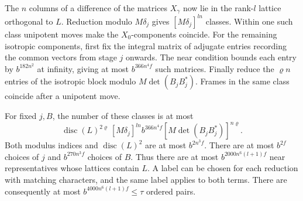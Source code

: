 The \(n\) columns of a difference of the matrices \(X_\gamma\) now lie
in the rank-\(l\) lattice orthogonal to \(L\). Reduction modulo
\(M\delta_j\) gives \([M\delta_j]^{ln}\) classes. Within one such class
unipotent moves make the \(X_0\)-components coincide. For the remaining
isotropic components, first fix the integral matrix of adjugate
entries recording the common vectors from stage \(j\) onwards. The
near condition bounds each entry by \(b^{182n^2}\) at infinity, giving
at most \(b^{366n^4 f}\) such matrices. Finally reduce the \(\varrho n\)
entries of the isotropic block modulo \(M\det(B_j B_j^*)\).
Frames in the same class coincide after a unipotent move.

For fixed \(j,B\), the number of these classes is at most
\[
 \operatorname{disc}(L)^{2\varrho}\,[M\delta_j]^{ln}
       b^{366n^4 f}[M\det(B_j B_j^*)]^{n\varrho}.
\]
Both modulus indices and \(\operatorname{disc}(L)^2\) are at most
\(b^{2n^3f}\). There are at most \(b^{2f}\) choices of \(j\) and
\(b^{270n^3f}\) choices of \(B\). Thus there are at most
\(b^{2000n^6(l+1)f}\) near representatives whose lattices contain \(L\).
A label can be chosen for each reduction with matching characters,
and the same label applies to both terms. There are consequently at
most \(b^{4000n^6(l+1)f}\le\tau\) ordered pairs.

